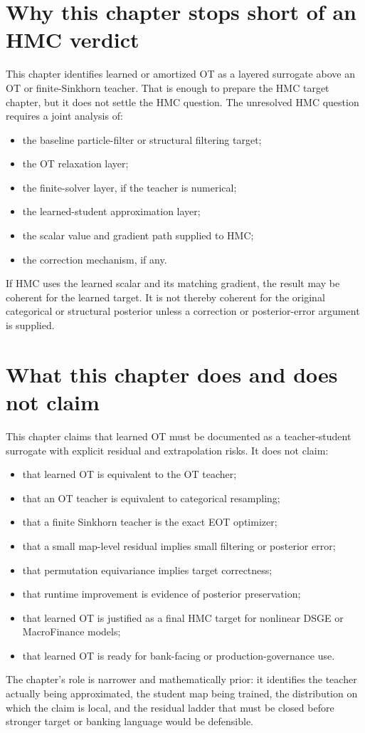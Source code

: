 \section{Why this chapter stops short of an HMC verdict}
\label{sec:bf-learned-ot-no-hmc-verdict}

This chapter identifies learned or amortized OT as a layered surrogate above an
OT or finite-Sinkhorn teacher.  That is enough to prepare the HMC target
chapter, but it does not settle the HMC question.  The unresolved HMC question
requires a joint analysis of:
\begin{itemize}
  \item the baseline particle-filter or structural filtering target;
  \item the OT relaxation layer;
  \item the finite-solver layer, if the teacher is numerical;
  \item the learned-student approximation layer;
  \item the scalar value and gradient path supplied to HMC;
  \item the correction mechanism, if any.
\end{itemize}
If HMC uses the learned scalar and its matching gradient, the result may be
coherent for the learned target.  It is not thereby coherent for the original
categorical or structural posterior unless a correction or posterior-error
argument is supplied.

\section{What this chapter does and does not claim}
\label{sec:bf-learned-ot-boundary}

This chapter claims that learned OT must be documented as a teacher-student
surrogate with explicit residual and extrapolation risks.  It does not claim:
\begin{itemize}
  \item that learned OT is equivalent to the OT teacher;
  \item that an OT teacher is equivalent to categorical resampling;
  \item that a finite Sinkhorn teacher is the exact EOT optimizer;
  \item that a small map-level residual implies small filtering or posterior
    error;
  \item that permutation equivariance implies target correctness;
  \item that runtime improvement is evidence of posterior preservation;
  \item that learned OT is justified as a final HMC target for nonlinear DSGE or
    MacroFinance models;
  \item that learned OT is ready for bank-facing or production-governance use.
\end{itemize}
The chapter's role is narrower and mathematically prior: it identifies the
teacher actually being approximated, the student map being trained, the
distribution on which the claim is local, and the residual ladder that must be
closed before stronger target or banking language would be defensible.

\FloatBarrier
